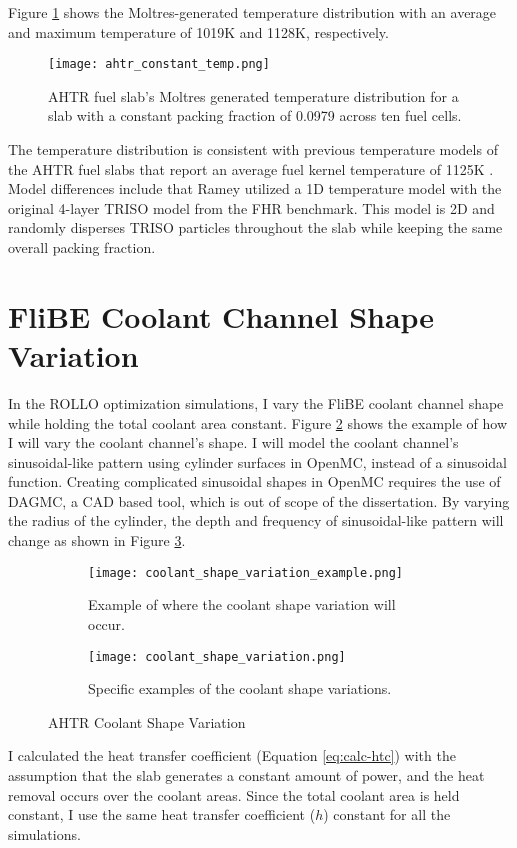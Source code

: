 Figure \ref{fig:ahtr_constant_temp} shows the Moltres-generated temperature 
distribution with an average and maximum temperature of 1019K and 1128K, 
respectively.
\begin{figure}[H]
    \centering
    \texttt{[image: ahtr\_constant\_temp.png]}
    \caption{AHTR fuel slab's Moltres generated temperature distribution for a 
    slab with a constant packing fraction of 0.0979 across ten fuel cells.}  
    \label{fig:ahtr_constant_temp}
\end{figure}
The temperature distribution is consistent with previous temperature models of 
the AHTR fuel slabs that report an average fuel kernel temperature of 1125K 
\cite{ramey_methodology_2021}. 
Model differences include that Ramey \cite{ramey_methodology_2021} utilized a 
1D temperature model with the original 4-layer TRISO model from the FHR benchmark. 
This model is 2D and randomly disperses TRISO particles throughout the 
slab while keeping the same overall packing fraction. 

\section{FliBE Coolant Channel Shape Variation}
In the ROLLO optimization simulations, I vary the FliBE coolant channel shape 
while holding the total coolant area constant.  
Figure \ref{fig:ahtr-coolant-shape-variation-1} shows the example of how I will 
vary the coolant channel's shape. 
I will model the coolant channel's sinusoidal-like pattern using cylinder 
surfaces in OpenMC, instead of a sinusoidal function. 
Creating complicated sinusoidal shapes in OpenMC requires the use of DAGMC, a 
CAD based tool, which is out of scope of the dissertation.
By varying the radius of the cylinder, the depth and frequency of sinusoidal-like 
pattern will change as shown in Figure \ref{fig:ahtr-coolant-shape-variation-2}. 
\begin{figure}[]
    \centering
    \begin{subfigure}{\textwidth}
        \texttt{[image: coolant\_shape\_variation\_example.png]}
        \caption{Example of where the coolant shape variation will occur.}
        \label{fig:ahtr-coolant-shape-variation-1}
    \end{subfigure}
    \begin{subfigure}{\textwidth}
        \texttt{[image: coolant\_shape\_variation.png]}
        \caption{Specific examples of the coolant shape variations.}
        \label{fig:ahtr-coolant-shape-variation-2}
    \end{subfigure}
    \caption{AHTR Coolant Shape Variation}  
    \label{fig:ahtr-coolant-shape-variation}
\end{figure}
I calculated the heat transfer coefficient (Equation \ref{eq:calc-htc}) with 
the assumption that the slab generates a constant amount of power, 
and the heat removal occurs over the coolant areas.
Since the total coolant area is held constant, I use the 
same heat transfer coefficient ($h$) constant for all the simulations.   
